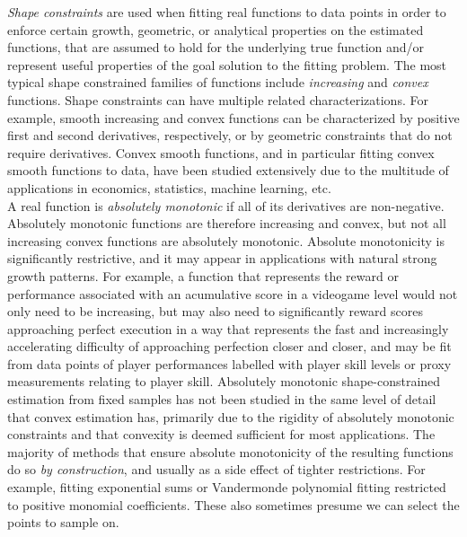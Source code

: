 \documentclass[12pt,a4paper]{article}
\begin{document}
{\emph{Shape constraints}} are used when fitting real functions to data points in order to enforce certain growth, geometric, or analytical properties on the estimated functions, that are assumed to hold for the underlying true function and/or represent useful properties of the goal solution to the fitting problem. The most typical shape constrained families of functions include {\emph{increasing}} and {\emph{convex}} functions. Shape constraints can have multiple related characterizations. For example, smooth increasing and convex functions can be characterized by positive first and second derivatives, respectively, or by geometric constraints that do not require derivatives. Convex smooth functions, and in particular fitting convex smooth functions to data, have been studied extensively \cite{2001_groeneboom_estimation_convex_function, 2015_lu_spline_monotonic_regression, 2015_lebair_derivative_constrain_spline, 2013_nagahara_monotone_splines_linear, 2004_zhang_monotone_splines, 1998_he_monotone_spline, 2008_aguilera_approximating_optimization_convex_functions, 2013_hannah_multivariate_convex_regression, 2002_holmstr_parameter_estimation_fitting_exponentials, 2005_lachand_minimizing_convex_bodies, 2011_kopotun_shape_preserving_approximation_algebraic_polynomials, 2012_wang_shape_regression_bernstein, 2023_ghosal_shape_regression_bernstein} due to the multitude of applications in economics, statistics, machine learning, etc.\\

A real function is {\emph{absolutely monotonic}} if all of its derivatives are non-negative. Absolutely monotonic functions are therefore increasing and convex, but not all increasing convex functions are absolutely monotonic. Absolute monotonicity is significantly restrictive, and it may appear in applications with natural strong growth patterns. For example, a function that represents the reward or performance associated with an acumulative score in a videogame level would not only need to be increasing, but may also need to significantly reward scores approaching perfect execution in a way that represents the fast and increasingly accelerating difficulty of approaching perfection closer and closer, and may be fit from data points of player performances labelled with player skill levels or proxy measurements relating to player skill. Absolutely monotonic shape-constrained estimation from fixed samples has not been studied in the same level of detail that convex estimation has, primarily due to the rigidity of absolutely monotonic constraints and that convexity is deemed sufficient for most applications. The majority of methods that ensure absolute monotonicity of the resulting functions do so {\emph{by construction}}, and usually as a side effect of tighter restrictions. For example, fitting exponential sums \cite{2002_holmstr_parameter_estimation_fitting_exponentials, 2021_keller_prony_methods,2020_chunaev_data_fitting_exponential_sums,1980_evans_least_squares_exponential_sum, 1976_smith_decomposition_exponential_decays, 1976_kammler_approximation_completely_monotonic} or Vandermonde polynomial fitting \cite{1970_bjorck_vandermonde} restricted to positive monomial coefficients. These also sometimes presume we can select the points to sample on.\\
\end{document}
